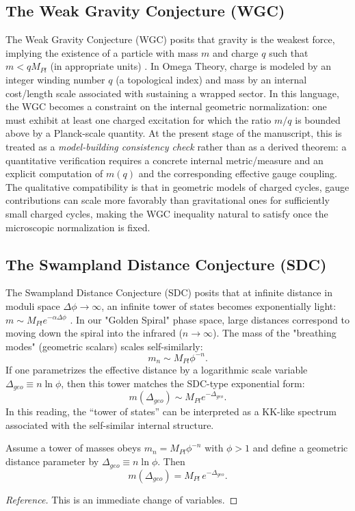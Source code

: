 \subsection{The Weak Gravity Conjecture (WGC)}
The Weak Gravity Conjecture (WGC) posits that gravity is the weakest force, implying the existence of a particle with mass $m$ and charge $q$ such that $m < q M_{Pl}$ (in appropriate units) \cite{ArkaniHamedMotlNicolisVafa2007}.
In Omega Theory, charge is modeled by an integer winding number $q$ (a topological index) and mass by an internal cost/length scale associated with sustaining a wrapped sector. In this language, the WGC becomes a constraint on the internal geometric normalization: one must exhibit at least one charged excitation for which the ratio $m/q$ is bounded above by a Planck-scale quantity.
At the present stage of the manuscript, this is treated as a \emph{model-building consistency check} rather than as a derived theorem: a quantitative verification requires a concrete internal metric/measure and an explicit computation of $m(q)$ and the corresponding effective gauge coupling. The qualitative compatibility is that in geometric models of charged cycles, gauge contributions can scale more favorably than gravitational ones for sufficiently small charged cycles, making the WGC inequality natural to satisfy once the microscopic normalization is fixed.

\subsection{The Swampland Distance Conjecture (SDC)}
The Swampland Distance Conjecture (SDC) posits that at infinite distance in moduli space $\Delta \phi \to \infty$, an infinite tower of states becomes exponentially light: $m \sim M_{Pl} e^{-\alpha \Delta \phi}$ \cite{OoguriVafa2007,Palti2019}.
In our "Golden Spiral" phase space, large distances correspond to moving down the spiral into the infrared ($n \to \infty$). The mass of the "breathing modes" (geometric scalars) scales self-similarly:
\begin{equation}
    m_n \sim M_{Pl} \phi^{-n}.
\end{equation}
If one parametrizes the effective distance by a logarithmic scale variable $\Delta_{geo}\equiv n\ln\phi$, then this tower matches the SDC-type exponential form:
\begin{equation}
    m(\Delta_{geo}) \sim M_{Pl} e^{-\Delta_{geo}}.
\end{equation}
In this reading, the ``tower of states'' can be interpreted as a KK-like spectrum associated with the self-similar internal structure.
\begin{proposition}
\label{prop:sdc_golden}
Assume a tower of masses obeys $m_n=M_{Pl}\phi^{-n}$ with $\phi>1$ and define a geometric distance parameter by $\Delta_{geo}\equiv n\ln\phi$. Then
\begin{equation}
    m(\Delta_{geo})=M_{Pl}\,e^{-\Delta_{geo}}.
\end{equation}
\end{proposition}
\begin{proof}[Reference]
This is an immediate change of variables.
\end{proof}

